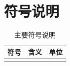 \section{符号说明}

\begin{table}[H]
  \centering
  \caption{主要符号说明}
  \begin{tabularx}{0.9\textwidth}{C{0.18\textwidth}L{0.48\textwidth}Y}
    \toprule
    符号 & 含义 & 单位 \\
    \midrule
     &  &  \\
    \bottomrule
  \end{tabularx}
\end{table}
